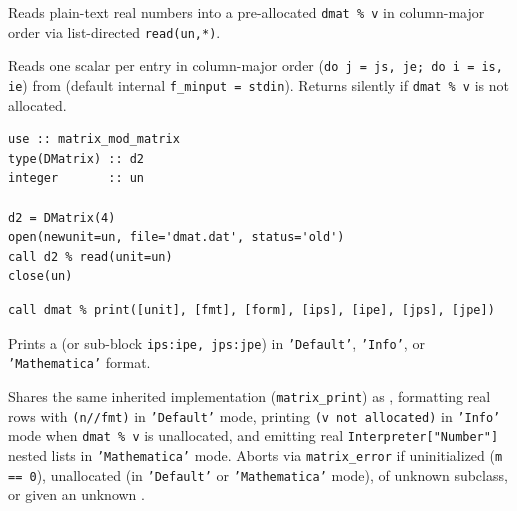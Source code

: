 Reads plain-text real numbers into a pre-allocated \texttt{dmat \% v} in column-major order via list-directed \texttt{read(un,*)}.

Reads one  scalar per entry in column-major order (\texttt{do j = js, je; do i = is, ie}) from  (default internal \texttt{f\_minput = stdin}). Returns silently if \texttt{dmat \% v} is not allocated.

\begin{description}[leftmargin=2.2cm, style=nextline]
\end{description}

\lstset{language=[95]Fortran}
\begin{lstlisting}
use :: matrix_mod_matrix
type(DMatrix) :: d2
integer       :: un

d2 = DMatrix(4)
open(newunit=un, file='dmat.dat', status='old')
call d2 % read(unit=un)
close(un)
\end{lstlisting}


\lstset{language=[95]Fortran}
\begin{lstlisting}
call dmat % print([unit], [fmt], [form], [ips], [ipe], [jps], [jpe])
\end{lstlisting}

Prints a  (or sub-block \texttt{ips:ipe, jps:jpe}) in \texttt{'Default'}, \texttt{'Info'}, or \texttt{'Mathematica'} format.

Shares the same inherited implementation (\texttt{matrix\_print}) as , formatting real rows with \texttt{(n//fmt)} in \texttt{'Default'} mode, printing \texttt{(v not allocated)} in \texttt{'Info'} mode when \texttt{dmat \% v} is unallocated, and emitting real \texttt{Interpreter["Number"]} nested lists in \texttt{'Mathematica'} mode. Aborts via \texttt{matrix\_error} if uninitialized (\texttt{m == 0}), unallocated (in \texttt{'Default'} or \texttt{'Mathematica'} mode), of unknown subclass, or given an unknown .


